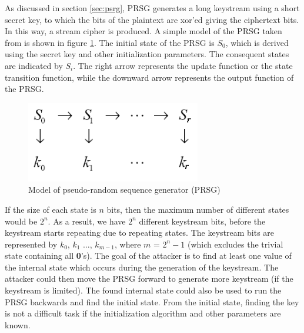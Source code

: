 As discussed in section \ref{sec:psrg}, PRSG generates a long keystream using a short secret key, to which the bits of the plaintext are xor'ed giving the ciphertext bits. In this way, a stream cipher is produced. A simple model of the PRSG taken from \cite{babbage} is shown in figure \ref{fig:psrg-model}. The initial state of the PRSG is $S_0$, which is derived using the secret key and other initialization parameters. The consequent states are indicated by $S_i$. The right arrow represents the update function or the state transition function, while the downward arrow represents the output function of the PRSG.

\begin{figure}[h]
	\centering
	\includegraphics[width=3in]{./figures/prsgmodel.png}
	\caption{Model of pseudo-random sequence generator (PRSG)}	
	\label{fig:psrg-model}
\end{figure}

If the size of each state is $n$ bits, then the maximum number of different states would be $2^n$. As a result, we have $2^n$ different keystream bits, before the keystream starts repeating due to repeating states. The keystream bits are represented by $k_0$, $k_1$ $\ldots$, $k_{m-1}$, where $m$ = $2^{n} - 1$ (which excludes the trivial state containing all \textbf{0}'s). The goal of the attacker is to find at least one value of the internal state which occurs during the generation of the keystream. The attacker could then move the PRSG forward to generate more keystream (if the keystream is limited). The found internal state could also be used to run the PRSG backwards and find the initial state. From the initial state, finding the key is not a difficult task if the initialization algorithm and other parameters are known.\\

